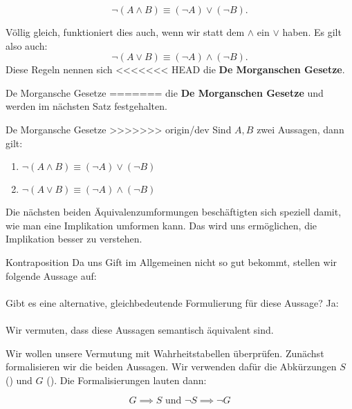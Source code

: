 \documentclass[../../main.tex]{subfiles}
\begin{document}
     \[\lnot( A \land B) \equiv (\lnot A) \lor (\lnot B).\]
     
     Völlig gleich, funktioniert dies auch, wenn wir 
     statt dem $\land$ ein $\lor$ haben. Es gilt also auch:
     \[\lnot( A \lor B) \equiv (\lnot A) \land (\lnot B).\]
      Diese Regeln nennen sich 
<<<<<<< HEAD
     die \textbf{De Morganschen Gesetze}.
     
    \begin{lemma}{De Morgansche Gesetze}
=======
     die \textbf{De Morganschen Gesetze} und werden im nächsten Satz festgehalten.
     
    \begin{theorem}{De Morgansche Gesetze}
>>>>>>> origin/dev
        Sind $A,B$ zwei Aussagen, dann gilt:
        \begin{enumerate}
            \item $\lnot( A \land B) \equiv (\lnot A) \lor (\lnot B)$
            \item $\lnot( A \lor B) \equiv (\lnot A) \land (\lnot B)$
        \end{enumerate}
    \end{theorem}
    
    Die nächsten beiden Äquivalenzumformungen beschäftigten sich speziell damit, wie 
    man eine Implikation umformen kann. Das wird uns ermöglichen,
    die Implikation besser zu verstehen.
    
    \begin{example}{Kontraposition}
        Da uns Gift im Allgemeinen nicht so gut bekommt, stellen wir folgende Aussage auf:
        \\ \\
        Gibt es eine alternative, gleichbedeutende Formulierung für diese Aussage? Ja:
        \\ \\
        Wir vermuten, dass diese Aussagen semantisch äquivalent sind.

        Wir wollen unsere Vermutung mit Wahrheitstabellen überprüfen. Zunächst formalisieren wir die beiden 
        Aussagen. Wir verwenden dafür die Abkürzungen $S$ () und $G$ (). Die Formalisierungen lauten dann:

        \[G \implies S \textrm{ und } \lnot S \implies \lnot G\]


\end{example}
\end{lemma}
\end{document}
